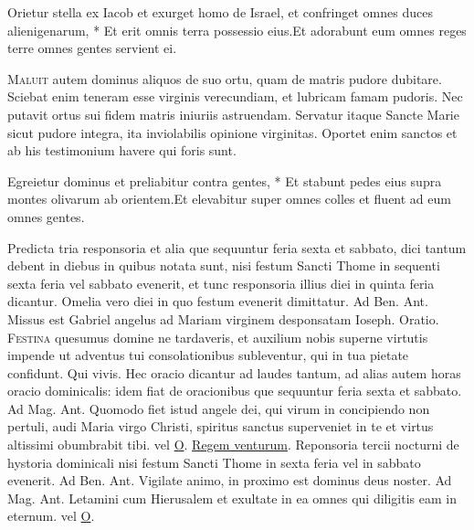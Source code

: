 \begin{multicols*}{2}
\begin{responsory}
{Orietur stella ex Iacob et exurget homo de Israel, et confringet omnes duces alienigenarum, * Et erit omnis terra possessio eius.}{Et adorabunt eum omnes reges terre omnes gentes servient ei.}
\end{responsory}
\lettrine[lines=2]{\zallmancaps \color{Red} M}{aluit} autem dominus aliquos de suo ortu, quam de matris pudore dubitare. Sciebat enim teneram esse virginis verecundiam, et lubricam famam pudoris. Nec putavit ortus sui fidem matris iniuriis astruendam. Servatur itaque Sancte Marie sicut pudore integra, ita inviolabilis opinione virginitas. Oportet enim sanctos et ab his testimonium havere qui foris sunt.
\begin{responsory-doxology}
{Egreietur dominus et preliabitur contra gentes, * Et stabunt pedes eius supra montes olivarum ab orientem.}{Et elevabitur super omnes colles et fluent ad eum omnes gentes.}
\end{responsory-doxology}
\newline Predicta tria responsoria et alia que sequuntur feria sexta et sabbato, dici tantum debent in diebus in quibus notata sunt, nisi festum Sancti Thome in sequenti sexta feria vel sabbato evenerit, et tunc responsoria illius diei in quinta feria dicantur. Omelia vero diei in quo festum evenerit dimittatur. {\color{Red} Ad Ben. Ant.} Missus est Gabriel angelus ad Mariam virginem desponsatam Ioseph. {\color{Red} Oratio.}
\lettrine[lines=2]{\zallmancaps \color{Blue} F}{estina} quesumus domine ne tardaveris, et auxilium nobis superne virtutis impende ut adventus tui consolationibus subleventur, qui in tua pietate confidunt. Qui vivis.
\newline Hec oracio dicantur ad laudes tantum, ad alias autem horas oracio dominicalis: idem fiat de oracionibus que sequuntur feria sexta et sabbato. {\color{Red} Ad Mag. Ant.} Quomodo fiet istud angele dei, qui virum in concipiendo non pertuli, audi Maria virgo Christi, spiritus sanctus superveniet in te et virtus altissimi obumbrabit tibi. {\color{Red} vel} \hyperlink{o-antiphons}{O}.
 \hyperlink{regem-venturum}{Regem venturum}. Reponsoria tercii nocturni de hystoria dominicali nisi festum Sancti Thome in sexta feria vel in sabbato evenerit. {\color{Red} Ad Ben. Ant.} Vigilate animo, in proximo est dominus deus noster. {\color{Red} Ad Mag. Ant.} Letamini cum Hierusalem et exultate in ea omnes qui diligitis eam in eternum. {\color{Red} vel} \hyperlink{o-antiphons}{O}.

\end{multicols*}

